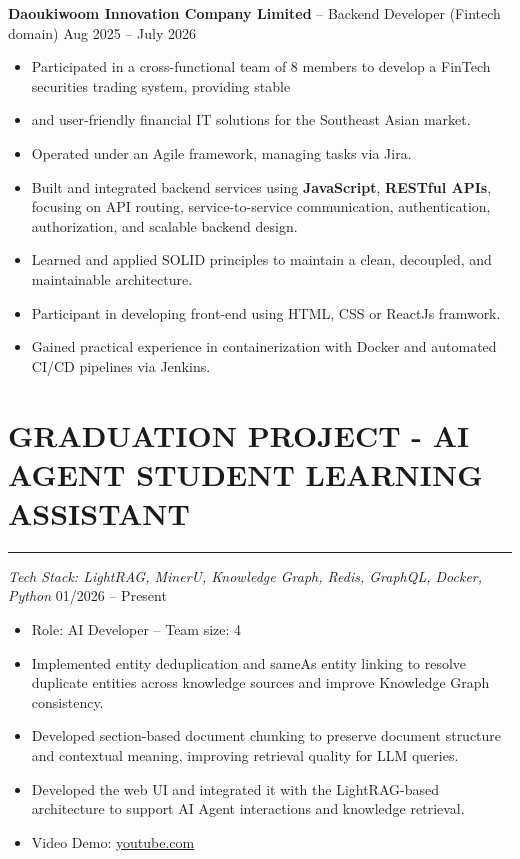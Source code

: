 \documentclass[a4paper,10pt]{article}
\begin{document}
\noindent
\textbf{Daoukiwoom Innovation Company Limited} -- Backend Developer (Fintech domain) \hfill Aug 2025 -- July 2026
\begin{itemize}
    \item Participated in a cross-functional team of 8 members to develop a FinTech securities trading system, providing stable
    \item and user-friendly financial IT solutions for the Southeast Asian market.
    \item Operated under an Agile framework, managing tasks via Jira.
    \item Built and integrated backend services using \textbf{JavaScript}, \textbf{RESTful APIs}, focusing on API routing, service-to-service communication, authentication, authorization, and scalable backend design.
    \item Learned and applied SOLID principles to maintain a clean, decoupled, and maintainable architecture.
    \item Participant in developing front-end using HTML, CSS or ReactJs framwork.
    \item Gained practical experience in containerization with Docker and automated CI/CD pipelines via Jenkins.
\end{itemize}

\vspace{-0.4cm}


\section*{GRADUATION PROJECT - AI AGENT STUDENT LEARNING ASSISTANT}
\vspace{-0.7em}
\hrule
\vspace{0.2em}
\textit{Tech Stack: LightRAG, MinerU, Knowledge Graph, Redis, GraphQL, Docker, Python } \hfill 01/2026 -- Present
\begin{itemize}
    \item Role: AI Developer – Team size: 4
    \item Implemented entity deduplication and sameAs entity linking to resolve duplicate entities across knowledge sources and improve Knowledge Graph consistency.
    \item Developed section-based document chunking to preserve document structure and contextual meaning, improving retrieval quality for LLM queries.
    \item Developed the web UI and integrated it with the LightRAG-based architecture to support AI Agent interactions and knowledge retrieval.
    \item Video Demo: \href{https://www.youtube.com/watch?v=nd5_PCkFh2w}{youtube.com}
\end{itemize}
\vspace{-0.4cm}
\end{document}
